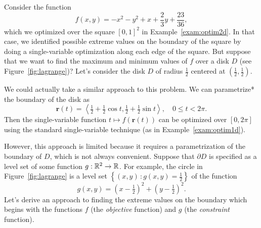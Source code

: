 \documentclass[svgnames]{watsonbook}
\begin{document}
  Consider the function
  \[
    f(x,y) = -x^2 - y^2 + x + \frac{2}{3} y + \frac{23}{36}, 
  \]
  which we optimized over the square $[0,1]^2$ in
  Example~\ref{exam:optim2d}. In that case, we identified possible
  extreme values on the boundary of the square by doing a
  single-variable optimization along each edge of the square. But
  suppose that we want to find the maximum and minimum values of $f$
  over a disk $D$ (see Figure~\ref{fig:lagrange})? Let's consider the
  disk $D$ of radius $\tfrac{1}{2}$ centered at
  $\left(\tfrac{1}{2}, \tfrac{1}{2}\right)$.

  We could actually take a similar approach to this problem. We can
  parametrize* the boundary of the disk as 
  \[
    \mathbf{r}(t) = \left\langle \tfrac{1}{2} + \tfrac{1}{2} \cos t,
    \tfrac{1}{2} + \tfrac{1}{2} \sin
    t \right\rangle, \quad 0 \leq t 
    < 2\pi. 
  \]
  Then the single-variable function $t\mapsto f(\mathbf{r}(t))$ can be
  optimized over $[0,2\pi]$ using the standard single-variable technique (as in
  Example~\ref{exam:optim1d}). 
  
  However, this approach is limited because it requires a
  parametrization of the boundary of $D$, which is not always
  convenient. Suppose that $\partial D$ is specified as a level set of
  some function $g: \mathbb{R}^2 \to \mathbb{R}$. For example, the
  circle in Figure~\ref{fig:lagrange} is a level set $\left\{(x,y) \, :
  g(x,y) = \tfrac{1}{2}\right\}$ of the function
  \[
    g(x,y) = \left(x-\tfrac{1}{2}\right)^2 + \left(y-\tfrac{1}{2}\right)^2. 
  \]
  Let's derive an approach to finding the extreme values on the
  boundary which begins with the functions $f$ (the \textit{objective}
  function) and $g$ (the \textit{constraint} function).
\end{document}
